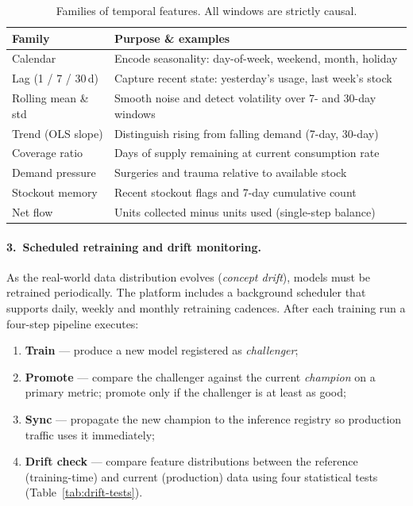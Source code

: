 \begin{table}[htbp]
\centering
\caption{Families of temporal features.  All windows are strictly causal.}
\label{tab:temporal-features}
\small
\begin{tabular}{@{}lp{7.2cm}@{}}
\toprule
\textbf{Family} & \textbf{Purpose \& examples} \\
\midrule
Calendar
    & Encode seasonality: day-of-week, weekend, month, holiday \\
Lag (1 / 7 / 30\,d)
    & Capture recent state: yesterday's usage, last week's stock \\
Rolling mean \& std
    & Smooth noise and detect volatility over 7- and 30-day windows \\
Trend (OLS slope)
    & Distinguish rising from falling demand (7-day, 30-day) \\
Coverage ratio
    & Days of supply remaining at current consumption rate \\
Demand pressure
    & Surgeries and trauma relative to available stock \\
Stockout memory
    & Recent stockout flags and 7-day cumulative count \\
Net flow
    & Units collected minus units used (single-step balance) \\
\bottomrule
\end{tabular}
\end{table}

\paragraph{3.\ Scheduled retraining and drift monitoring.}

As the real-world data distribution evolves (\emph{concept drift}),
models must be retrained periodically.  The platform includes a background
scheduler that supports daily, weekly and monthly retraining cadences.
After each training run a four-step pipeline executes:

\begin{enumerate}
\item \textbf{Train} — produce a new model registered as
      \emph{challenger};
\item \textbf{Promote} — compare the challenger against the current
      \emph{champion} on a primary metric; promote only if the
      challenger is at least as good;
\item \textbf{Sync} — propagate the new champion to the inference
      registry so production traffic uses it immediately;
\item \textbf{Drift check} — compare feature distributions between
      the reference (training-time) and current (production) data
      using four statistical tests
      (Table~\ref{tab:drift-tests}).
\end{enumerate}

